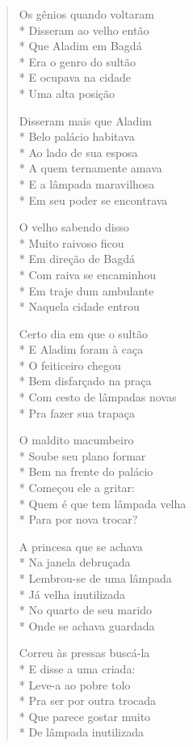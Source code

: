 \begin{verse}
Os gênios quando voltaram\\*
Disseram ao velho então\\*
Que Aladim em Bagdá\\*
Era o genro do sultão\\*
E ocupava na cidade\\*
Uma alta posição

Disseram mais que Aladim\\*
Belo palácio habitava\\*
Ao lado de sua esposa\\*
A quem ternamente amava\\*
E a lâmpada maravilhosa\\*
Em seu poder se encontrava

O velho sabendo disso\\*
Muito raivoso ficou\\*
Em direção de Bagdá\\*
Com raiva se encaminhou\\*
Em traje dum ambulante\\*
Naquela cidade entrou

Certo dia em que o sultão\\*
E Aladim foram à caça\\*
O feiticeiro chegou\\*
Bem disfarçado na praça\\*
Com cesto de lâmpadas novas\\*
Pra fazer sua trapaça

O maldito macumbeiro\\*
Soube seu plano formar\\*
Bem na frente do palácio\\*
Começou ele a gritar:\\*
Quem é que tem lâmpada velha\\*
Para por nova trocar?

A princesa que se achava\\*
Na janela debruçada\\*
Lembrou-se de uma lâmpada\\*
Já velha inutilizada\\*
No quarto de seu marido\\*
Onde se achava guardada

Correu às pressas buscá-la\\*
E disse a uma criada:\\*
Leve-a ao pobre tolo\\*
Pra ser por outra trocada\\*
Que parece gostar muito\\*
De lâmpada inutilizada


\end{verse}

